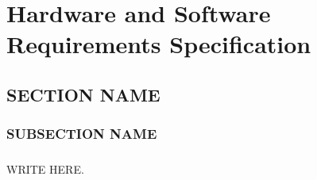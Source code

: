\chapter{Hardware and Software Requirements Specification}
\section{SECTION NAME}
\subsection{SUBSECTION NAME}
\paragraph{} WRITE HERE.